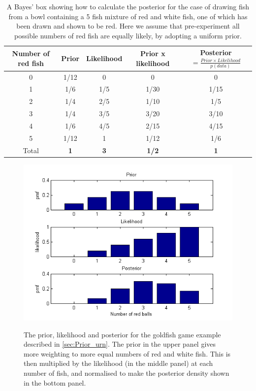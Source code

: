 \documentclass[11pt,fullpage]{book}
\begin{document}
\begin{table}[htbp]
  \centering
  \caption{A Bayes' box showing how to calculate the posterior for the case of drawing fish from a bowl containing a 5 fish mixture of red and white fish, one of which has been drawn and shown to be red. Here we assume that pre-experiment all possible numbers of red fish are equally likely, by adopting a uniform prior.}\label{tab:Prior_bayesBoxUrnUpdated}%
    \begin{tabular}{ccccc}
    \toprule
    \textbf{Number of red fish} & \textbf{Prior} & \textbf{Likelihood} & \textbf{Prior x likelihood} & \textbf{Posterior$=\frac{Prior\times Likelihood}{p(data)}$} \\
    \midrule
    0     &   1/12 & 0     & 0       & 0       \\
    1     &   1/6  &  1/5  &   1/30 &   1/15 \\
    2     &   1/4  &  2/5  &   1/10 &   1/5  \\
    3     &   1/4  &  3/5  &   3/20 &   3/10 \\
    4     &   1/6  &  4/5  &   2/15 &   4/15 \\
    5     &   1/12 & 1     &   1/12 &   1/6  \\
    \bottomrule
    Total & \textbf{1      } & \textbf{3    } & \textbf{  1/2 } & \textbf{1      } \\
    \bottomrule
    \end{tabular}%
  
\end{table}%

\begin{figure}
\centering
\scalebox{0.75} 
{\includegraphics{Prior_bayesUrnUpdated.png}}\caption{The prior, likelihood and posterior for the goldfish game example described in \ref{sec:Prior_urn}. The prior in the upper panel gives more weighting to more equal numbers of red and white fish. This is then multiplied by the likelihood (in the middle panel) at each number of fish, and normalised to make the posterior density shown in the bottom panel.}\label{fig:Prior_bayesUrnUpdated}
\end{figure}
\end{document}
